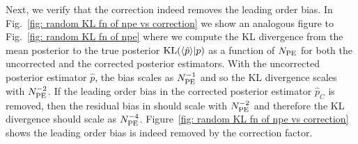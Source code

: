 Next, we verify that the correction indeed removes the leading order bias. In Fig.~\ref{fig: random KL fn of npe vs correction} we show an analogous figure to Fig.~\ref{fig: random KL fn of npe} where we compute the \ac{KL} divergence from the mean posterior to the true posterior ${\rm KL}(\langle \hat{p}\rangle|p)$ as a function of $N_{\rm PE}$ for both the uncorrected and the corrected posterior estimators. With the uncorrected posterior estimator $\hat{p}$, the bias scales as $N_{\rm PE}^{-1}$ and so the \ac{KL} divergence scales with $N_{\rm PE}^{-2}$. If the leading order bias in the corrected posterior estimator $\hat{p}_C$ is removed, then the residual bias in should scale with $N_{\rm PE}^{-2}$ and therefore the \ac{KL} divergence should scale as $N_{\rm PE}^{-4}$. Figure~\ref{fig: random KL fn of npe vs correction} shows the leading order bias is indeed removed by the correction factor.
